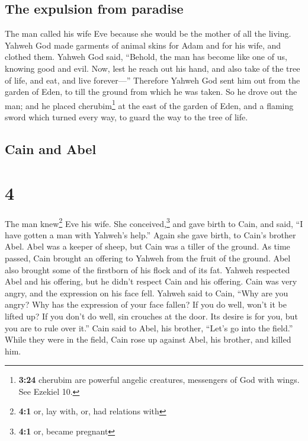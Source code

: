 \hypertarget{the-expulsion-from-paradise}{%
\subsection{The expulsion from
paradise}\label{the-expulsion-from-paradise}}

 The man called his wife Eve because she would be the
mother of all the living.  Yahweh God made garments of
animal skins for Adam and for his wife, and clothed them.
 Yahweh God said, ``Behold, the man has become like one
of us, knowing good and evil. Now, lest he reach out his hand, and also
take of the tree of life, and eat, and live forever---'' 
Therefore Yahweh God sent him out from the garden of Eden, to till the
ground from which he was taken.  So he drove out the man;
and he placed cherubim\footnote{\textbf{3:24} cherubim are powerful
  angelic creatures, messengers of God with wings. See Ezekiel 10.} at
the east of the garden of Eden, and a flaming sword which turned every
way, to guard the way to the tree of life.

\hypertarget{cain-and-abel}{%
\subsection{Cain and Abel}\label{cain-and-abel}}

\hypertarget{section-3}{%
\section{4}\label{section-3}}

 The man knew\footnote{\textbf{4:1} or, lay with, or, had
  relations with} Eve his wife. She conceived,\footnote{\textbf{4:1} or,
  became pregnant} and gave birth to Cain, and said, ``I have gotten a
man with Yahweh's help.''  Again she gave birth, to Cain's
brother Abel. Abel was a keeper of sheep, but Cain was a tiller of the
ground.  As time passed, Cain brought an offering to
Yahweh from the fruit of the ground.  Abel also brought
some of the firstborn of his flock and of its fat. Yahweh respected Abel
and his offering,  but he didn't respect Cain and his
offering. Cain was very angry, and the expression on his face fell.
 Yahweh said to Cain, ``Why are you angry? Why has the
expression of your face fallen?  If you do well, won't it
be lifted up? If you don't do well, sin crouches at the door. Its desire
is for you, but you are to rule over it.''  Cain said to
Abel, his brother, ``Let's go into the field.'' While they were in the
field, Cain rose up against Abel, his brother, and killed him.

